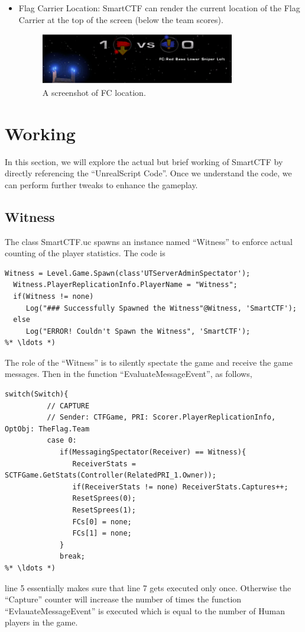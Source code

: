 \documentclass{article}
\begin{document}
\begin{itemize}
\item Flag Carrier Location: SmartCTF can render the current location of the Flag Carrier at the top of the screen (below the team scores).
  \begin{figure}
\centering
\label{fig:fcloc}
\includegraphics[width=0.8\textwidth]{fcloc}
\caption{A screenshot of FC location.}
\end{figure}
  
\end{itemize}

\section{Working}
In this section, we will explore the actual but brief working of SmartCTF by directly referencing the ``UnrealScript Code''.  Once we understand the code, we can perform further tweaks to enhance the gameplay.

\subsection{Witness}
\label{Sec:witness}
The class {\color{Orange}SmartCTF.uc} spawns an instance named ``Witness'' to enforce actual counting of the player statistics.  The code is 
\begin{lstlisting}[frame=single]
  Witness = Level.Game.Spawn(class'UTServerAdminSpectator');
  Witness.PlayerReplicationInfo.PlayerName = "Witness";
  if(Witness != none)
     Log("### Successfully Spawned the Witness"@Witness, 'SmartCTF');
  else
     Log("ERROR! Couldn't Spawn the Witness", 'SmartCTF');
%* \ldots *)
\end{lstlisting}

The role of the ``Witness'' is to silently spectate the game and receive the game messages.  Then in the function ``EvaluateMessageEvent'', as follows,

\begin{lstlisting}[frame=single]
  switch(Switch){
          // CAPTURE
          // Sender: CTFGame, PRI: Scorer.PlayerReplicationInfo, OptObj: TheFlag.Team
          case 0:
             if(MessagingSpectator(Receiver) == Witness){
                ReceiverStats = SCTFGame.GetStats(Controller(RelatedPRI_1.Owner));
                if(ReceiverStats != none) ReceiverStats.Captures++;
                ResetSprees(0);
                ResetSprees(1);
                FCs[0] = none;
                FCs[1] = none;
             }
             break;
%* \ldots *) 
\end{lstlisting}
line 5 essentially makes sure that line 7 gets executed only once.  Otherwise the ``Capture'' counter will increase the number of times the function ``EvlauateMessageEvent'' is executed which is equal to the number of Human players in the game.
\end{document}
